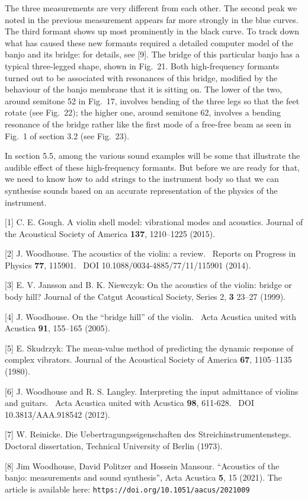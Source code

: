   The three measurements are very different from each other. The second peak we 
  noted in the previous measurement appears far more strongly in the blue 
  curves. The third formant shows up most prominently in the black curve. To 
  track down what has caused these new formants required a detailed computer 
  model of the banjo and its bridge: for details, see [9]. The bridge of this 
  particular banjo has a typical three-legged shape, shown in Fig.\ 21. Both 
  high-frequency formants turned out to be associated with resonances of this 
  bridge, modified by the behaviour of the banjo membrane that it is sitting 
  on. The lower of the two, around semitone 52 in Fig.\ 17, involves bending of 
  the three legs so that the feet rotate (see Fig.\ 22); the higher one, around 
  semitone 62, involves a bending resonance of the bridge rather like the first 
  mode of a free-free beam as seen in Fig.\ 1 of section 3.2 (see Fig.\ 23). 

  In section 5.5, among the various sound examples will be some that illustrate 
  the audible effect of these high-frequency formants. But before we are ready 
  for that, we need to know how to add strings to the instrument body so that 
  we can synthesise sounds based on an accurate representation of the physics 
  of the instrument. 



  \sectionreferences{}[1] C. E. Gough. A violin shell model: vibrational modes 
  and acoustics. Journal of the Acoustical Society of America \textbf{137}, 
  1210–1225 (2015). 

  [2] J. Woodhouse. The acoustics of the violin: a review.~ Reports on Progress 
  in Physics \textbf{77}, 115901.~ DOI 10.1088/0034-4885/77/11/115901 (2014). 

  [3] E. V. Jansson and B. K. Niewczyk: On the acoustics of the violin: bridge 
  or body hill? Journal of the Catgut Acoustical Society, Series 2, \textbf{3 } 
  23–27 (1999). 

  [4] J. Woodhouse. On the ``bridge hill'' of the violin.~ Acta Acustica united 
  with Acustica \textbf{91}, 155–165 (2005). 

  [5] E. Skudrzyk: The mean-value method of predicting the dynamic response of 
  complex vibrators. Journal of the Acoustical Society of America \textbf{67}, 
  1105–1135 (1980). 

  [6] J. Woodhouse and R. S. Langley. Interpreting the input admittance of 
  violins and guitars.~ Acta Acustica united with Acustica \textbf{98}, 
  611-628.~ DOI 10.3813/AAA.918542 (2012). 

  [7] W. Reinicke. Die Uebertragungseigenschaften des Streichinstrumentenstegs. 
  Doctoral dissertation, Technical University of Berlin (1973). 

  [8] Jim Woodhouse, David Politzer and Hossein Mansour. ``Acoustics of the 
  banjo: measurements and sound synthesis'', Acta Acustica \textbf{5}, 15 
  (2021). The article is available here: 
  \tt{}https://doi.org/10.1051/aacus/2021009\rm{} 